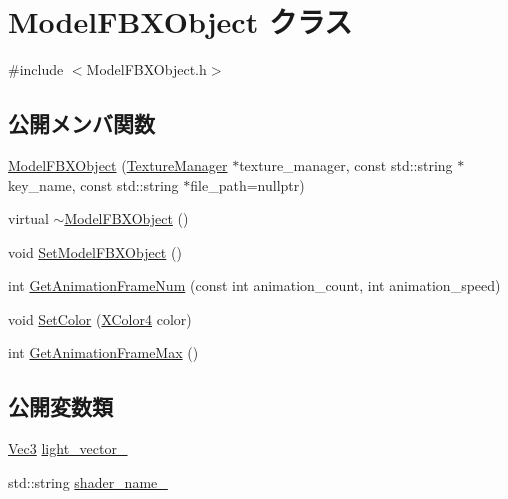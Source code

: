 \hypertarget{class_model_f_b_x_object}{}\section{Model\+F\+B\+X\+Object クラス}
\label{class_model_f_b_x_object}


{\ttfamily \#include $<$Model\+F\+B\+X\+Object.\+h$>$}

\subsection*{公開メンバ関数}
\begin{DoxyCompactItemize}
\item 
\mbox{\hyperlink{class_model_f_b_x_object_a45586ead07b17f4a90ba320c41d7f1c3}{Model\+F\+B\+X\+Object}} (\mbox{\hyperlink{class_texture_manager}{Texture\+Manager}} $\ast$texture\+\_\+manager, const std\+::string $\ast$key\+\_\+name, const std\+::string $\ast$file\+\_\+path=nullptr)
\item 
virtual \mbox{\hyperlink{class_model_f_b_x_object_a3fa838235e50d797539d6b266f8e2c96}{$\sim$\+Model\+F\+B\+X\+Object}} ()
\item 
void \mbox{\hyperlink{class_model_f_b_x_object_a3c101cf65da1bdb55b7a11e71cefcad0}{Set\+Model\+F\+B\+X\+Object}} ()
\item 
int \mbox{\hyperlink{class_model_f_b_x_object_a87516b4e5aa6341188e47f956d4a180f}{Get\+Animation\+Frame\+Num}} (const int animation\+\_\+count, int animation\+\_\+speed)
\item 
void \mbox{\hyperlink{class_model_f_b_x_object_acbe9d90631a3ac39b9cf65097c39aaa9}{Set\+Color}} (\mbox{\hyperlink{_vector3_d_8h_a680c30c4a07d86fe763c7e01169cd6cc}{X\+Color4}} color)
\item 
int \mbox{\hyperlink{class_model_f_b_x_object_abbeaa886c4f8f6c0d1608d58cc013226}{Get\+Animation\+Frame\+Max}} ()
\end{DoxyCompactItemize}
\subsection*{公開変数類}
\begin{DoxyCompactItemize}
\item 
\mbox{\hyperlink{_vector3_d_8h_ab16f59e4393f29a01ec8b9bbbabbe65d}{Vec3}} \mbox{\hyperlink{class_model_f_b_x_object_a9d7b849ac816b7e5841d54a4b75216a9}{light\+\_\+vector\+\_\+}}
\item 
std\+::string \mbox{\hyperlink{class_model_f_b_x_object_a9a1728e6b2d5f1a49b26c1aaf75049f0}{shader\+\_\+name\+\_\+}}
\end{DoxyCompactItemize}


